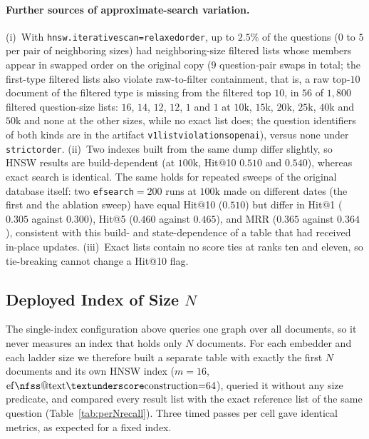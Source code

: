 \documentclass{ieeeaccess}
\makeatletter
\DeclareRobustCommand{\_}{\ifmmode\nfss@text{\textunderscore}\else\textunderscore\allowbreak\fi}
\makeatother
\begin{document}
\paragraph{Further sources of approximate-search variation.}
(i)~With \texttt{hnsw.iterative\_scan=relaxed\_order}, up to $2.5\%$ of the questions ($0$ to $5$ per pair of neighboring sizes) had neighboring-size filtered lists whose members appear in swapped order on the original copy ($9$ question-pair swaps in total; the first-type filtered lists also violate raw-to-filter containment, that is, a raw top-$10$ document of the filtered type is missing from the filtered top $10$, in $56$ of $1{,}800$ filtered question-size lists: $16$, $14$, $12$, $12$, $1$ and $1$ at $10\text{k}$, $15\text{k}$, $20\text{k}$, $25\text{k}$, $40\text{k}$ and $50\text{k}$ and none at the other sizes, while no exact list does; the question identifiers of both kinds are in the artifact \texttt{v1\_list\_violations\_openai}), versus none under \texttt{strict\_order}. (ii)~Two indexes built from the same dump differ slightly, so HNSW results are build-dependent (at $100\text{k}$, Hit@10 $0.510$ and $0.540$), whereas exact search is identical. The same holds for repeated sweeps of the original database itself: two \texttt{ef\_search}${=}200$ runs at $100\text{k}$ made on different dates (the first and the ablation sweep) have equal Hit@10 ($0.510$) but differ in Hit@1 ($0.305$ against $0.300$), Hit@5 ($0.460$ against $0.465$), and MRR ($0.365$ against $0.364$), consistent with this build- and state-dependence of a table that had received in-place updates. (iii)~Exact lists contain no score ties at ranks ten and eleven, so tie-breaking cannot change a Hit@10 flag.

\subsection{Deployed Index of Size $N$}
\label{sec:perN}
The single-index configuration above queries one graph over all documents, so it never measures an index that holds only $N$ documents. For each embedder and each ladder size we therefore built a separate table with exactly the first $N$ documents and its own HNSW index ($m{=}16$, $\mathrm{ef\_construction}{=}64$), queried it without any size predicate, and compared every result list with the exact reference list of the same question (Table~\ref{tab:perNrecall}). Three timed passes per cell gave identical metrics, as expected for a fixed index.
\end{document}
